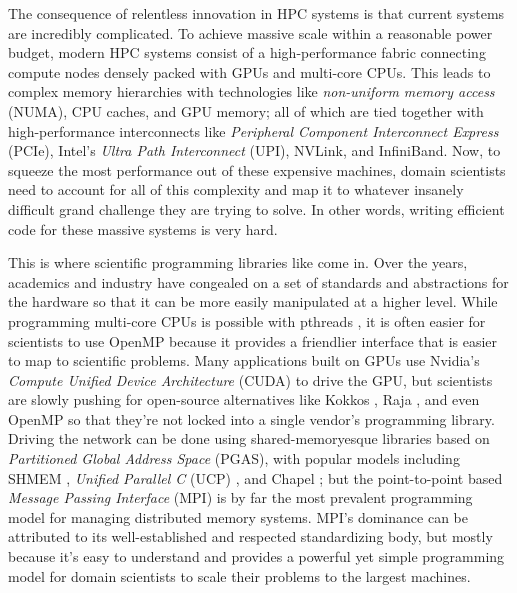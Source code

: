 The consequence of relentless innovation in HPC systems is that current systems are incredibly complicated.
To achieve massive scale within a reasonable power budget, modern HPC systems consist of a high-performance fabric connecting compute nodes densely packed with GPUs and multi-core CPUs.
This leads to complex memory hierarchies with technologies like \textit{non-uniform memory access} (NUMA), CPU caches, and GPU memory; all of which are tied together with high-performance interconnects like \textit{Peripheral Component Interconnect Express} (PCIe), Intel's \textit{Ultra Path Interconnect} (UPI), NVLink, and InfiniBand.
Now, to squeeze the most performance out of these expensive machines, domain scientists need to account for all of this complexity and map it to whatever insanely difficult grand challenge they are trying to solve.
In other words, writing efficient code for these massive systems is very hard.

This is where scientific programming libraries like come in.
Over the years, academics and industry have congealed on a set of standards and abstractions for the hardware so that it can be more easily manipulated at a higher level.
While programming multi-core CPUs is possible with pthreads \cite{pthreads}, it is often easier for scientists to use OpenMP \cite{OpenMP} because it provides a friendlier interface that is easier to map to scientific problems.
Many applications built on GPUs use Nvidia's \textit{Compute Unified Device Architecture} (CUDA) \cite{CUDA} to drive the GPU, but scientists are slowly pushing for open-source alternatives like Kokkos \cite{kokkos}, Raja \cite{Raja}, and even OpenMP so that they're not locked into a single vendor's programming library.
Driving the network can be done using shared-memoryesque libraries based on \textit{Partitioned Global Address Space} (PGAS), with popular models including SHMEM \cite{OpenSHMEM}, \textit{Unified Parallel C} (UCP) \cite{UPC}, and Chapel \cite{Chapel}; but the point-to-point based \textit{Message Passing Interface} (MPI) \cite{mpi40} is by far the most prevalent programming model for managing distributed memory systems.
MPI's dominance can be attributed to its well-established and respected standardizing body, but mostly because it's easy to understand and provides a powerful yet simple programming model for domain scientists to scale their problems to the largest machines. 

